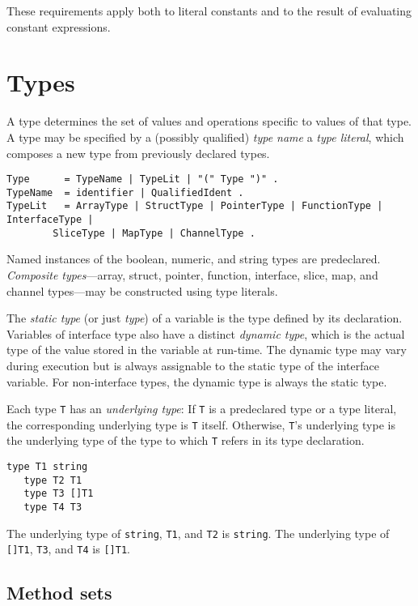 These requirements apply both to literal constants and to the result of
evaluating constant expressions.

\section*{Types}

A type determines the set of values and operations specific to
values of that type. A type may be specified by a (possibly qualified)
\emph{type name} a \emph{type literal}, which composes a new type
from previously declared types.

\begin{Verbatim}[frame=single]
Type      = TypeName | TypeLit | "(" Type ")" .
TypeName  = identifier | QualifiedIdent .
TypeLit   = ArrayType | StructType | PointerType | FunctionType | InterfaceType |
        SliceType | MapType | ChannelType .
\end{Verbatim}

Named instances of the boolean, numeric, and string types are
predeclared. \emph{Composite
types}---array, struct, pointer, function, interface, slice, map, and
channel types---may be constructed using type literals.

The \emph{static type} (or just \emph{type}) of a variable is the type
defined by its declaration. Variables of interface type also have a
distinct \emph{dynamic type}, which is the actual type of the value
stored in the variable at run-time. The dynamic type may vary during
execution but is always assignable to the
static type of the interface variable. For non-interface types, the
dynamic type is always the static type.

Each type \texttt{T} has an \emph{underlying type}: If \texttt{T} is a
predeclared type or a type literal, the corresponding underlying type is
\texttt{T} itself. Otherwise, \texttt{T}'s underlying type is the
underlying type of the type to which \texttt{T} refers in its
type declaration.

\begin{Verbatim}[frame=single]
   type T1 string
   type T2 T1
   type T3 []T1
   type T4 T3
\end{Verbatim}

The underlying type of \texttt{string}, \texttt{T1}, and \texttt{T2} is
\texttt{string}. The underlying type of \texttt{{[}{]}T1}, \texttt{T3},
and \texttt{T4} is \texttt{{[}{]}T1}.

\subsection*{Method sets}

